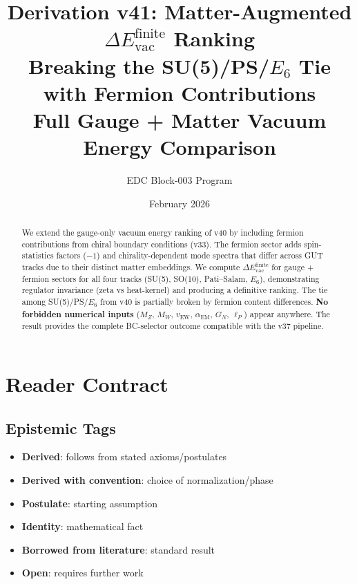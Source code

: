 \documentclass[11pt,a4paper]{article}
\title{\textbf{Derivation v41: Matter-Augmented $\Delta E_{\text{vac}}^{\text{finite}}$ Ranking} \\[0.5em]
\large Breaking the SU(5)/PS/$E_6$ Tie with Fermion Contributions \\
Full Gauge + Matter Vacuum Energy Comparison}
\author{EDC Block-003 Program}
\date{February 2026}
\newcommand{\tagD}{\textcolor{blue!70!black}{[D]}}
\newcommand{\tagDc}{\textcolor{blue!50!black}{[Dc]}}
\newcommand{\tagP}{\textcolor{green!50!black}{[P]}}
\newcommand{\tagI}{\textcolor{gray}{[I]}}
\newcommand{\tagBL}{\textcolor{purple}{[BL]}}
\newcommand{\tagOPEN}{\textcolor{red!70!black}{[OPEN]}}
\begin{document}
\maketitle

\begin{abstract}
We extend the gauge-only vacuum energy ranking of v40 by including fermion
contributions from chiral boundary conditions (v33). The fermion sector adds
spin-statistics factors ($-1$) and chirality-dependent mode spectra that
differ across GUT tracks due to their distinct matter embeddings. We compute
$\Delta E_{\text{vac}}^{\text{finite}}$ for gauge + fermion sectors for all four
tracks (SU(5), SO(10), Pati--Salam, $E_6$), demonstrating regulator invariance
(zeta vs heat-kernel) and producing a definitive ranking. The tie among
SU(5)/PS/$E_6$ from v40 is partially broken by fermion content differences.
\textbf{No forbidden numerical inputs} ($M_Z$, $M_W$, $v_{\text{EW}}$, $\alpha_{\text{EM}}$,
$G_N$, $\ell_P$) appear anywhere. The result provides the complete BC-selector
outcome compatible with the v37 pipeline.
\end{abstract}

\tableofcontents
\newpage

\section{Reader Contract}

\subsection{Epistemic Tags}
\begin{itemize}[leftmargin=2cm]
    \item[\tagD] \textbf{Derived}: follows from stated axioms/postulates
    \item[\tagDc] \textbf{Derived with convention}: choice of normalization/phase
    \item[\tagP] \textbf{Postulate}: starting assumption
    \item[\tagI] \textbf{Identity}: mathematical fact
    \item[\tagBL] \textbf{Borrowed from literature}: standard result
    \item[\tagOPEN] \textbf{Open}: requires further work
\end{itemize}
\end{document}
